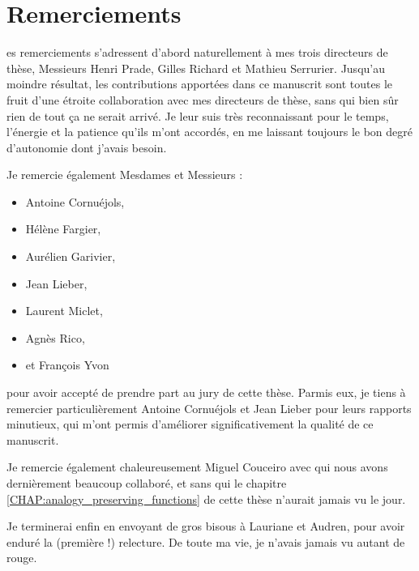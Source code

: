 \chapter*{Remerciements}
es remerciements s'adressent d'abord naturellement à mes trois
directeurs de thèse, Messieurs Henri Prade, Gilles Richard et Mathieu
Serrurier. Jusqu'au moindre résultat, les contributions apportées dans ce
manuscrit sont toutes le fruit d'une étroite collaboration avec mes directeurs
de thèse, sans qui bien sûr rien de tout ça ne serait arrivé. Je leur suis très
reconnaissant pour le temps, l'énergie et la patience qu'ils m'ont accordés, en
me laissant toujours le bon degré d'autonomie dont j'avais besoin.

Je remercie également Mesdames et Messieurs :
\begin{itemize}
  \item Antoine Cornuéjols,
  \item Hélène Fargier,
  \item Aurélien Garivier,
  \item Jean Lieber,
  \item Laurent Miclet,
  \item Agnès Rico,
  \item et François Yvon
\end{itemize}
pour avoir accepté de prendre part au jury de cette thèse. Parmis eux, je tiens
à remercier particulièrement Antoine Cornuéjols et Jean Lieber pour leurs
rapports minutieux, qui m'ont permis d'améliorer significativement la qualité
de ce manuscrit.

Je remercie également chaleureusement Miguel Couceiro avec qui nous avons
dernièrement beaucoup collaboré, et sans qui le chapitre
\ref{CHAP:analogy_preserving_functions} de cette thèse n'aurait jamais vu le
jour.

Je terminerai enfin en envoyant de gros bisous à Lauriane et Audren, pour avoir
enduré la (première !) relecture. De toute ma vie, je n'avais jamais vu autant
de rouge.
